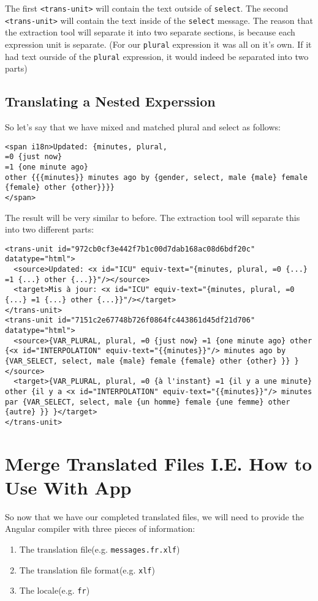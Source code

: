 The first \lstinline{<trans-unit>} will contain the text outside of 
\lstinline{select}. The second \lstinline{<trans-unit>} will contain the text
inside of the \lstinline{select} message. The reason that the extraction tool 
will separate it into two separate sections, is because each expression unit is 
separate. (For our \lstinline{plural} expression it was all on it's own. If it 
had text ourside of the \lstinline{plural} expression, it would indeed be 
separated into two parts)

\subsection{Translating a Nested Experssion}
So let's say that we have mixed and matched plural and select as follows: 
\begin{lstlisting}
<span i18n>Updated: {minutes, plural,
=0 {just now}
=1 {one minute ago}
other {{{minutes}} minutes ago by {gender, select, male {male} female {female} other {other}}}}
</span>
\end{lstlisting}

The result will be very similar to before. The extraction tool will separate 
this into two different parts: 
\begin{lstlisting}[caption=src/locale/messages.fr.xlf]
<trans-unit id="972cb0cf3e442f7b1c00d7dab168ac08d6bdf20c" datatype="html">
  <source>Updated: <x id="ICU" equiv-text="{minutes, plural, =0 {...} =1 {...} other {...}}"/></source>
  <target>Mis à jour: <x id="ICU" equiv-text="{minutes, plural, =0 {...} =1 {...} other {...}}"/></target>
</trans-unit>
<trans-unit id="7151c2e67748b726f0864fc443861d45df21d706" datatype="html">
  <source>{VAR_PLURAL, plural, =0 {just now} =1 {one minute ago} other {<x id="INTERPOLATION" equiv-text="{{minutes}}"/> minutes ago by {VAR_SELECT, select, male {male} female {female} other {other} }} }</source>
  <target>{VAR_PLURAL, plural, =0 {à l'instant} =1 {il y a une minute} other {il y a <x id="INTERPOLATION" equiv-text="{{minutes}}"/> minutes par {VAR_SELECT, select, male {un homme} female {une femme} other {autre} }} }</target>
</trans-unit>  
\end{lstlisting}

\section{Merge Translated Files I.E. How to Use With App}
So now that we have our completed translated files, we will need to provide the
Angular compiler with three pieces of information: 
\begin{enumerate}
  \item The translation file(e.g. \lstinline{messages.fr.xlf})
  \item The translation file format(e.g. \lstinline{xlf})
  \item The locale(e.g. \lstinline{fr})
\end{enumerate}

